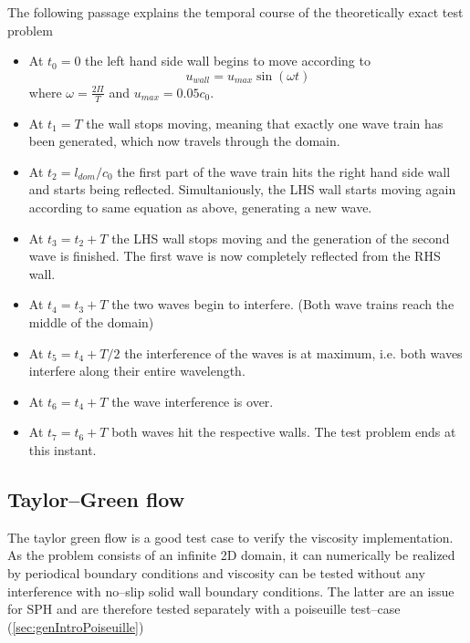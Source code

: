 \documentclass{report}
\begin{document}
The following passage explains the temporal course of the theoretically exact test problem

\begin{itemize} 
\item At $t_0=0$ the left hand side wall begins to move according to 
\begin{equation}
  u_{\mathit{wall}}=u_{\mathit{max}}\sin(\omega t) 
\end{equation}
  where $\omega=\frac{2\Pi}{T}$ and $u_{\mathit{max}}=0.05 c_0$.


\item At $t_1=T$ the wall stops moving, meaning that exactly one wave train has been generated, which now travels through the domain.

\item At $t_2=l_{\mathit{dom}}/c_0$ the first part of the wave train hits the right hand side  wall and starts being reflected. Simultaniously, the LHS wall starts moving again according to same equation as above, generating a new wave.

\item At $t_3=t_2+T$ the LHS wall stops moving and the generation of the second wave is finished. 
The first wave is now completely reflected from the RHS wall.

\item At $t_4=t_3+T$ the two waves begin to interfere. (Both wave trains reach the middle of the domain)

\item At $t_5=t_4+T/2$ the interference of the waves is at maximum, i.e. both waves interfere along their entire wavelength.

\item At $t_6=t_4+T$ the wave interference is over.

\item At $t_7=t_6+T$ both waves hit the respective walls. The test problem ends at this instant.
\end{itemize}



\subsection{Taylor--Green flow}
The taylor green flow is a good test case to verify the viscosity implementation. As the problem consists of an infinite 2D domain, it can numerically be realized by periodical boundary conditions and viscosity can be tested without any interference with no--slip solid wall boundary conditions. The latter are an issue for SPH and are therefore tested separately with a poiseuille test--case (\ref{sec:genIntroPoiseuille})
\end{document}
